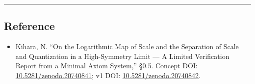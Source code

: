 \documentclass[11pt]{ltjsarticle}
\providecommand{\tightlist}{\setlength{\itemsep}{0pt}\setlength{\parskip}{0pt}}
\begin{document}
\begin{center}\rule{0.5\linewidth}{0.5pt}\end{center}

\subsection{Reference}\label{reference}

\begin{itemize}
\tightlist
\item
  Kihara, N. ``On the Logarithmic Map of Scale and the Separation of
  Scale and Quantization in a High-Symmetry Limit --- A Limited
  Verification Report from a Minimal Axiom System,'' §0.5. Concept DOI:
  \href{https://doi.org/10.5281/zenodo.20740841}{10.5281/zenodo.20740841};
  v1 DOI:
  \href{https://doi.org/10.5281/zenodo.20740842}{10.5281/zenodo.20740842}.
\end{itemize}
\end{document}
